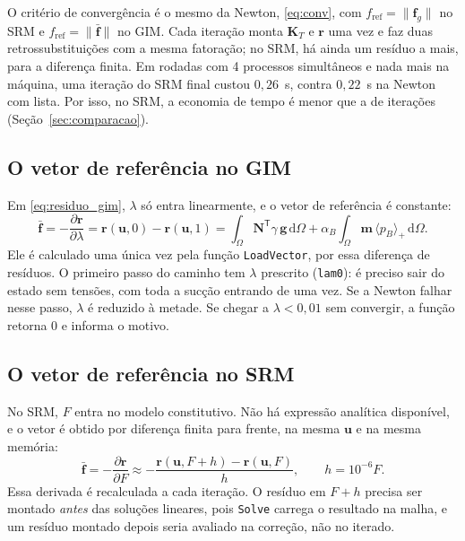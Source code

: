 \documentclass[11pt,a4paper]{article}
\numberwithin{equation}{section}
\begin{document}
O critério de convergência é o mesmo da Newton, \eqref{eq:conv}, com $f_{\mathrm{ref}} = \|\mathbf{f}_g\|$ no SRM e $f_{\mathrm{ref}} = \|\bar{\mathbf{f}}\|$ no GIM. Cada iteração monta $\mathbf{K}_T$ e $\mathbf{r}$ uma vez e faz duas retrossubstituições com a mesma fatoração; no SRM, há ainda um
resíduo a mais, para a diferença finita. Em rodadas com 4 processos simultâneos e nada mais na máquina, uma iteração do SRM final custou $0{,}26$~s, contra $0{,}22$~s na Newton com lista. Por isso, no SRM, a economia de tempo é menor que a de iterações (Seção~\ref{sec:comparacao}).

\subsection{O vetor de referência no GIM}\label{sec:fbar_gim}

Em \eqref{eq:residuo_gim}, $\lambda$ só entra linearmente, e o vetor de referência é constante:
\begin{equation}
\bar{\mathbf{f}} = -\frac{\partial\mathbf{r}}{\partial\lambda} = \mathbf{r}(\mathbf{u},0) - \mathbf{r}(\mathbf{u},1)
= \int_\Omega \mathbf{N}^{\mathsf T}\gamma\,\mathbf{g}\,\mathrm{d}\Omega + \alpha_B\int_\Omega \mathbf{m}\,\langle p_B\rangle_{+}\,\mathrm{d}\Omega .
\end{equation}
Ele é calculado uma única vez pela função \texttt{LoadVector}, por essa diferença de resíduos. O primeiro passo do caminho tem $\lambda$ prescrito (\texttt{lam0}): é preciso sair do estado sem tensões, com toda a sucção entrando de uma vez. Se a Newton falhar nesse passo, $\lambda$ é reduzido à metade. Se chegar a $\lambda < 0{,}01$ sem convergir, a função retorna 0 e informa o motivo.

\subsection{O vetor de referência no SRM}\label{sec:fbar_srm}

No SRM, $F$ entra no modelo constitutivo. Não há expressão analítica disponível, e o vetor é obtido por diferença finita para frente, na mesma $\mathbf{u}$ e na mesma memória:
\begin{equation}
\bar{\mathbf{f}} = -\frac{\partial\mathbf{r}}{\partial F} \approx -\frac{\mathbf{r}(\mathbf{u},F+h) - \mathbf{r}(\mathbf{u},F)}{h}, \qquad h = 10^{-6}F .
\end{equation}
Essa derivada é recalculada a cada iteração. O resíduo em $F+h$ precisa ser montado \emph{antes} das soluções lineares, pois \texttt{Solve} carrega o resultado na malha, e um resíduo montado depois seria avaliado na correção, não no iterado.
\end{document}
